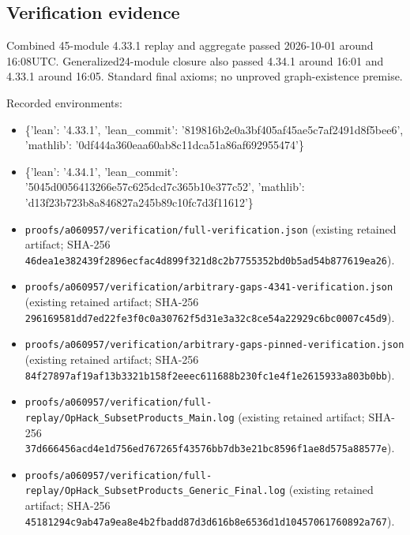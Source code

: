 \documentclass[11pt,a4paper]{article}
\begin{document}
\begin{samepage}
\subsection{Verification evidence}
Combined 45-module 4.33.1 replay and aggregate passed 2026-10-01 around 16:08UTC. Generalized24-module closure also passed 4.34.1 around 16:01 and 4.33.1 around 16:05. Standard final axioms; no unproved graph-existence premise.

Recorded environments:

\begin{itemize}
\item \{'lean': '4.33.1', 'lean\_commit': '819816b2e0a3bf405af45ae5c7af2491d8f5bee6', 'mathlib': '0df444a360eaa60ab8c11dca51a86af692955474'\}
\end{itemize}
\begin{itemize}
\item \{'lean': '4.34.1', 'lean\_commit': '5045d0056413266e57c625dcd7c365b10e377c52', 'mathlib': 'd13f23b723b8a846827a245b89c10fc7d3f11612'\}
\end{itemize}
\begin{itemize}
\item \texttt{proofs/a060957/verification/full-verification.json} (existing retained artifact; SHA-256 \texttt{46dea1e382439f2896ecfac4d899f321d8c2b7755352bd0b5ad54b877619ea26}).
\end{itemize}
\begin{itemize}
\item \texttt{proofs/a060957/verification/arbitrary-gaps-4341-verification.json} (existing retained artifact; SHA-256 \texttt{296169581dd7ed22fe3f0c0a30762f5d31e3a32c8ce54a22929c6bc0007c45d9}).
\end{itemize}
\begin{itemize}
\item \texttt{proofs/a060957/verification/arbitrary-gaps-pinned-verification.json} (existing retained artifact; SHA-256 \texttt{84f27897af19af13b3321b158f2eeec611688b230fc1e4f1e2615933a803b0bb}).
\end{itemize}
\begin{itemize}
\item \texttt{proofs/a060957/verification/full-replay/OpHack\_SubsetProducts\_Main.log} (existing retained artifact; SHA-256 \texttt{37d666456acd4e1d756ed767265f43576bb7db3e21bc8596f1ae8d575a88577e}).
\end{itemize}
\begin{itemize}
\item \texttt{proofs/a060957/verification/full-replay/OpHack\_SubsetProducts\_Generic\_Final.log} (existing retained artifact; SHA-256 \texttt{45181294c9ab47a9ea8e4b2fbadd87d3d616b8e6536d1d10457061760892a767}).
\end{itemize}
\end{samepage}
\clearpage
\end{document}
